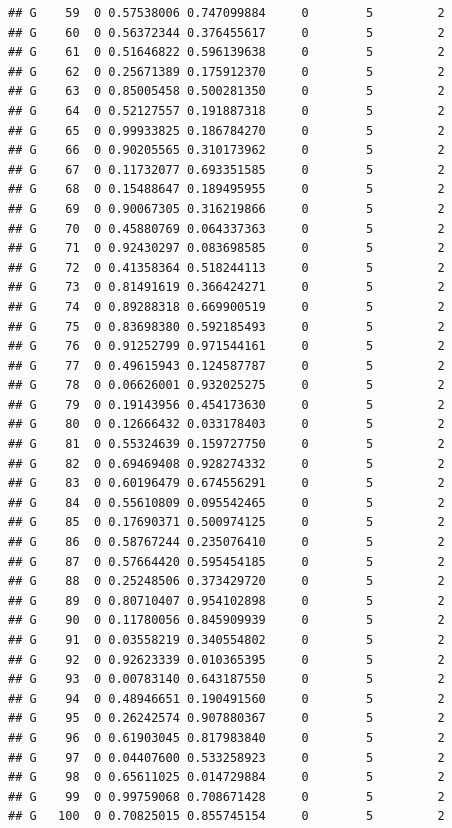 \documentclass{article}\usepackage[]{graphicx}\usepackage[]{color}
\makeatletter
\newenvironment{kframe}{%
 \def\at@end@of@kframe{}%
 \ifinner\ifhmode%
  \def\at@end@of@kframe{\end{minipage}}%
  \begin{minipage}{\columnwidth}%
 \fi\fi%
 \def\FrameCommand##1{\hskip\@totalleftmargin \hskip-\fboxsep
 \colorbox{shadecolor}{##1}\hskip-\fboxsep
     \hskip-\linewidth \hskip-\@totalleftmargin \hskip\columnwidth}%
 \MakeFramed {\advance\hsize-\width
   \@totalleftmargin\z@ \linewidth\hsize
   \@setminipage}}%
 {\par\unskip\endMakeFramed%
 \at@end@of@kframe}
\newenvironment{knitrout}{}{} %
\makeatother
\begin{document}
\begin{knitrout}
\begin{kframe}
\begin{verbatim}
## G    59  0 0.57538006 0.747099884     0        5         2
## G    60  0 0.56372344 0.376455617     0        5         2
## G    61  0 0.51646822 0.596139638     0        5         2
## G    62  0 0.25671389 0.175912370     0        5         2
## G    63  0 0.85005458 0.500281350     0        5         2
## G    64  0 0.52127557 0.191887318     0        5         2
## G    65  0 0.99933825 0.186784270     0        5         2
## G    66  0 0.90205565 0.310173962     0        5         2
## G    67  0 0.11732077 0.693351585     0        5         2
## G    68  0 0.15488647 0.189495955     0        5         2
## G    69  0 0.90067305 0.316219866     0        5         2
## G    70  0 0.45880769 0.064337363     0        5         2
## G    71  0 0.92430297 0.083698585     0        5         2
## G    72  0 0.41358364 0.518244113     0        5         2
## G    73  0 0.81491619 0.366424271     0        5         2
## G    74  0 0.89288318 0.669900519     0        5         2
## G    75  0 0.83698380 0.592185493     0        5         2
## G    76  0 0.91252799 0.971544161     0        5         2
## G    77  0 0.49615943 0.124587787     0        5         2
## G    78  0 0.06626001 0.932025275     0        5         2
## G    79  0 0.19143956 0.454173630     0        5         2
## G    80  0 0.12666432 0.033178403     0        5         2
## G    81  0 0.55324639 0.159727750     0        5         2
## G    82  0 0.69469408 0.928274332     0        5         2
## G    83  0 0.60196479 0.674556291     0        5         2
## G    84  0 0.55610809 0.095542465     0        5         2
## G    85  0 0.17690371 0.500974125     0        5         2
## G    86  0 0.58767244 0.235076410     0        5         2
## G    87  0 0.57664420 0.595454185     0        5         2
## G    88  0 0.25248506 0.373429720     0        5         2
## G    89  0 0.80710407 0.954102898     0        5         2
## G    90  0 0.11780056 0.845909939     0        5         2
## G    91  0 0.03558219 0.340554802     0        5         2
## G    92  0 0.92623339 0.010365395     0        5         2
## G    93  0 0.00783140 0.643187550     0        5         2
## G    94  0 0.48946651 0.190491560     0        5         2
## G    95  0 0.26242574 0.907880367     0        5         2
## G    96  0 0.61903045 0.817983840     0        5         2
## G    97  0 0.04407600 0.533258923     0        5         2
## G    98  0 0.65611025 0.014729884     0        5         2
## G    99  0 0.99759068 0.708671428     0        5         2
## G   100  0 0.70825015 0.855745154     0        5         2

\end{verbatim}
\end{kframe}
\end{knitrout}
\end{document}
